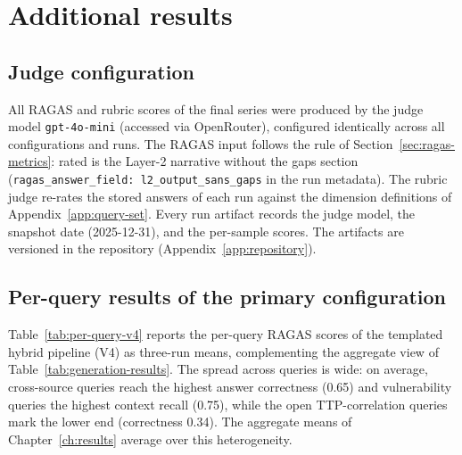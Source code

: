 \chapter{Additional results}
\label{app:additional-results}

\section*{Judge configuration}

All RAGAS and rubric scores of the final series were produced by the
judge model \texttt{gpt-4o-mini} (accessed via OpenRouter), configured
identically across all configurations and runs. The RAGAS input
follows the rule of Section~\ref{sec:ragas-metrics}: rated is the
Layer-2 narrative without the gaps section
(\texttt{ragas\_answer\_field: l2\_output\_sans\_gaps} in the run
metadata). The rubric judge re-rates the stored answers of each run
against the dimension definitions of
Appendix~\ref{app:query-set}. Every run artifact records the judge
model, the snapshot date (2025-12-31), and the per-sample scores. The
artifacts are versioned in the repository
(Appendix~\ref{app:repository}).

\section*{Per-query results of the primary configuration}

Table~\ref{tab:per-query-v4} reports the per-query RAGAS scores of the
templated hybrid pipeline (V4) as three-run means, complementing the
aggregate view of Table~\ref{tab:generation-results}. The spread
across queries is wide: on average, cross-source queries reach the
highest answer correctness (0.65) and vulnerability queries the
highest context recall (0.75), while the open TTP-correlation queries
mark the lower end (correctness 0.34). The aggregate means of
Chapter~\ref{ch:results} average over this heterogeneity.

\begingroup
\small

\endgroup
